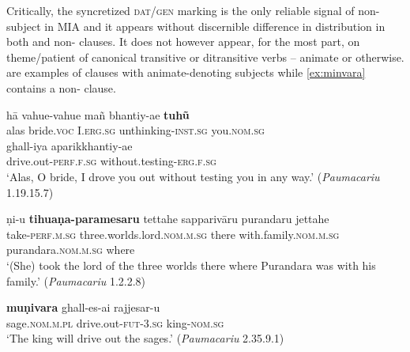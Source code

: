 \documentclass[output=paper,
modfonts
]{LSP/langsci}
\begin{document}
Critically, the syncretized \textsc{dat/gen}  marking  is the only reliable signal of non-subject  in MIA and it appears without discernible difference in distribution in both  and non- clauses. It does not however appear, for the most part,  on theme/patient  of canonical transitive or ditransitive verbs -- animate or otherwise.  are examples of  clauses with animate-denoting subjects while \cref{ex:minvara} contains a non- clause. 

\begin{exe}
\ex\label{nompatients}
\begin{xlist}
\ex\label{ex:ha}\gll hā vahue-vahue mañ bhantiy-ae    \textbf{tuhũ}\\
alas  bride.\textsc{voc} I.\textsc{erg.sg} unthinking-\textsc{inst.sg}  you.\textsc{nom.sg}\\

\gll ghall-iya aparikkhantiy-ae \\
drive.out-\textsc{perf.f.sg} without.testing-\textsc{erg.f.sg} \\ \glt `Alas, O bride, I drove you out without testing you in any way.' (\textit{Paumacariu} 1.19.15.7)

\ex\label{ex:niu}\gll ṇi-u \textbf{tihuaṇa-paramesaru} tettahe    sapparivāru purandaru jettahe \\
take-\textsc{perf.m.sg} three.worlds.lord.\textsc{nom.m.sg} there with.family.\textsc{nom.m.sg} purandara.\textsc{nom.m.sg} where \\ \glt `(She) took the lord of the three worlds there where Purandara was with his family.' (\textit{Paumacariu} 1.2.2.8)

\ex\label{ex:minvara}\gll \textbf{muṇivara} ghall-es-ai rajjesar-u \\
sage.\textsc{nom.m.pl} drive.out-\textsc{fut-3.sg}  king-\textsc{nom.sg} \\
\glt `The king will drive out the sages.' (\textit{Paumacariu} 2.35.9.1)
\end{xlist}
\end{exe}

\end{document}
